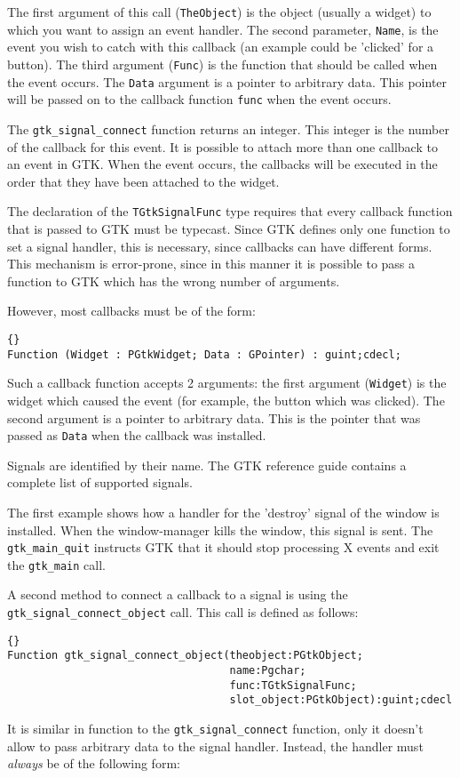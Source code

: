 \documentclass[10pt]{article}
\begin{document}
The first argument of this call (\lstinline|TheObject|) is the object 
(usually a widget) to which you want to assign an event handler. The second
parameter, \lstinline|Name|, is the event you wish to catch with this
callback (an example could be 'clicked' for a button). The third argument
(\lstinline|Func|) is the function that should be called when the event occurs. 
The \lstinline|Data| argument is a pointer to arbitrary data. This pointer
will be passed on to the callback function \lstinline|func| when the event
occurs.

The \lstinline|gtk_signal_connect| function returns an integer. This integer 
is the number of the callback for this event. It is possible to attach more 
than one callback to an event in GTK. When the event occurs, the callbacks 
will be executed in the order that they have been attached to the widget. 

The declaration of the \lstinline|TGtkSignalFunc| type requires that every
callback function that is passed to GTK must be typecast. Since GTK defines
only one function to set a signal handler, this is necessary, since
callbacks can have different forms. This mechanism is error-prone, since
in this manner it is possible to pass a function to GTK which has the wrong
number of arguments.

However, most callbacks must be of the form:
\begin{lstlisting}{}
Function (Widget : PGtkWidget; Data : GPointer) : guint;cdecl;
\end{lstlisting}
Such a callback function accepts 2 arguments: the first argument
(\lstinline|Widget|) is the widget which caused the event 
(for example, the button which was clicked). The second argument is a
pointer to arbitrary data. This is the pointer that was passed as
\lstinline|Data| when the callback was installed.

Signals are identified by their name. The GTK reference guide contains a
complete list of supported signals.

The first example shows how a handler for the 'destroy' signal of the
window is installed. When the window-manager kills the window, this 
signal is sent. The \lstinline|gtk_main_quit| instructs GTK that it 
should stop processing X events and exit the \lstinline|gtk_main| call.

A second method to connect a callback to a signal is using the
\lstinline|gtk_signal_connect_object| call. This call is defined as
follows:
\begin{lstlisting}{}
Function gtk_signal_connect_object(theobject:PGtkObject;
                                   name:Pgchar;
                                   func:TGtkSignalFunc;
                                   slot_object:PGtkObject):guint;cdecl
\end{lstlisting}
It is similar in function to the \lstinline|gtk_signal_connect| function,
only it doesn't allow to pass arbitrary data to the signal handler. Instead,
the handler must {\em always} be of the following form:
\end{document}
